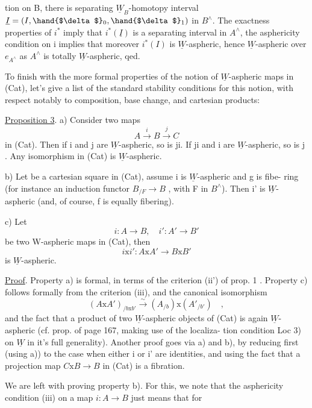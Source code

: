 
tion on B,  there is   separating $\underline{W}_B$-homotopy interval
$\underline{I} = (I,\hand{$\delta$}_0,\hand{$\delta$}_1)$ in $B^\wedge$.  The exactness properties of $i^*$  imply that
$i^*(\underline{I})$  is a separating interval in $A^\wedge$,   the asphericity condition on
i implies that moreover $i^*(I)$ is $\underline{W}$-aspheric,  hence $\underline{W}$-aspheric over $e_{A^\wedge}$
as $A^\wedge$ is  totally $\underline{W}$-aspheric,  qed.

To finish  with the more formal properties of the notion of
$\underline{W}$-aspheric maps in (Cat),  let's give a list of the standard stability
conditions for this notion,  with respect notably to composition,  base
change,  and cartesian products:

\uline{Proposition 3}.   a)  Consider two maps  
\[ A \xrightarrow{i} B \xrightarrow{j} C \]
in (Cat).   Then if  i and j are $\underline{W}$-aspheric,  so is ji.  If ji and i are
$\underline{W}$-aspheric,  so is j .  Any isomorphism in (Cat) is $\underline{W}$-aspheric.

b)   Let
be a cartesian square in (Cat),  assume i is $\underline{W}$-aspheric and g is fibe-%
ring  (for instance an induction functor  $B_{/F} \to B$ ,  with  F in $B^\wedge$).
Then i' is $\underline{W}$-aspheric  (and, of course,  f is equally fibering).

c)   Let
\[ i: A \to B , \quad i' : A' \to B' \]
be two W-aspheric maps in (Cat),  then
\[ i\mathrm{x}i' : A\mathrm{x}A' \to B\mathrm{x}B' \]
is $\underline{W}$-aspheric.

\uline{Proof}.  Property a) is formal,  in terms of the criterion (ii') of
prop. 1 .  Property c) follows formally from the criterion (iii),  and
the canonical isomorphism
\[ (A\mathrm{x}A')_{/b\mathrm{x}b'} \xrightarrow{\sim} (A_{/b})\mathrm{x}(A'_{/b'}) \quad , \]
and the fact that a product of two $\underline{W}$-aspheric objects of (Cat) is again
$\underline{W}$-aspheric  (cf.  prop. of page 167,  making use of   the localiza-%
tion condition  Loc 3)  on $\underline{W}$  in it's full generality).   Another proof
goes via  a) and b),  by reducing first (using a)) to the case when
either i or i' are identities,  and using the fact that a projection map
$C\mathrm{x}B \to B$ in (Cat) is a fibration.

We are left with proving property b).  For this,  we note that the
asphericity condition (iii) on a map $i: A \to B$  just means that  for

